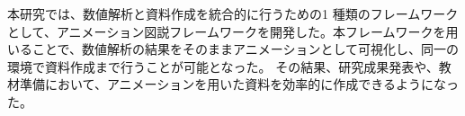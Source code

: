 本研究では、数値解析と資料作成を統合的に行うための1 種類のフレームワークとして、アニメーション図説フレームワークを開発した。本フレームワークを用いることで、数値解析の結果をそのままアニメーションとして可視化し、同一の環境で資料作成まで行うことが可能となった。
その結果、研究成果発表や、教材準備において、アニメーションを用いた資料を効率的に作成できるようになった。